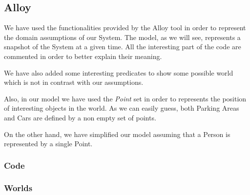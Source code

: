 \subsection{Alloy}
We have used the functionalities provided by the Alloy tool in order to represent the domain assumptions of our System. 
The model, as we will see, represents a snapshot of the System at a given time.
All the interesting part of the code are commented in order to better explain their meaning.

We have also added some interesting predicates to show some possible world which is not in contrast with our assumptions.

Also, in our model we have used the \textit{Point} set in order to represents the position of interesting objects in the world. As we can easily guess, both Parking Areas and Cars are defined by a non empty set of points.

On the other hand, we have simplified our model assuming that a Person is represented by a single Point.


\subsubsection{Code}





\subsubsection{Worlds}

